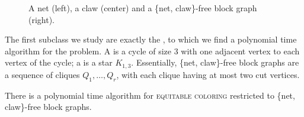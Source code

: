 \begin{figure}[!htb]
    \hfill
    
    
    \caption{A net (left), a claw (center) and a \{net, claw\}-free block graph (right).}
    \label{fig:net_claw}
\end{figure}

The first subclass we study are exactly the , to which we find a polynomial time algorithm for the problem.
A  is a cycle of size 3 with one adjacent vertex to each vertex of the cycle; a  is a star $K_{1,3}$.
Essentially, \{net, claw\}-free block graphs are a sequence of cliques $Q_1, \dots, Q_r$, with each clique having at most two cut vertices.

\begin{theorem}
    \label{thm:fat_path}
    There is a polynomial time algorithm for \textsc{equitable coloring} restricted to \{net, claw\}-free block graphs.
\end{theorem}

